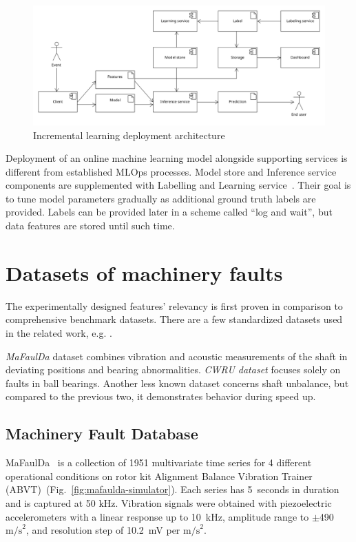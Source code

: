\begin{figure}[ht]
    \centering
    \includegraphics[width=\textwidth]{assets/analysis/incremental-learning.png}
    \caption{Incremental learning deployment architecture~\cite{gaia_online_2022}}
    \label{fig:online-learn-arch}
\end{figure}

Deployment of an online machine learning model alongside supporting services is different from established MLOps processes. Model store and Inference service components are supplemented with Labelling and Learning service~\cite{gaia_online_2022}. Their goal is to tune model parameters gradually as additional ground truth labels are provided. Labels can be provided later in a scheme called ``log and wait'', but data features are stored until such time.

\section{Datasets of machinery faults} \label{section:evaluation-datasets}
The experimentally designed features' relevancy is first proven in comparison to comprehensive benchmark datasets. There are a few standardized datasets used in the related work, e.g. \cite{ribeiro_rotating_2017}.

\emph{MaFaulDa} dataset combines vibration and acoustic measurements of the shaft in deviating positions and bearing abnormalities. \emph{CWRU dataset} focuses solely on faults in ball bearings. Another less known dataset concerns shaft unbalance, but compared to the previous two, it demonstrates behavior during speed up.

\subsection{Machinery Fault Database}
MaFaulDa~\cite{mafaulda_dataset} is a collection of 1951 multivariate time series for 4 different operational conditions on rotor kit Alignment Balance Vibration Trainer (ABVT)~(Fig.~\ref{fig:mafaulda-simulator}). Each series has 5~seconds in duration and is captured at 50 kHz. Vibration signals were obtained with piezoelectric accelerometers with a linear response up to 10~kHz, amplitude range to $\pm$490 $\mathrm{m/s}^2$, and resolution step of 10.2~mV per $\mathrm{m/s}^2$.

